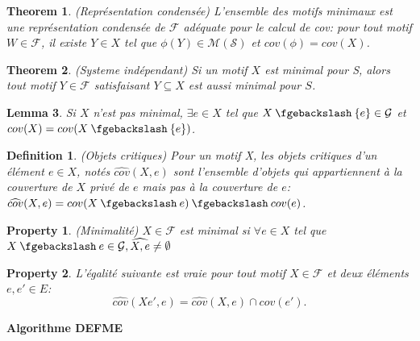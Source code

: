 \documentclass[a4paper,12pt,openany,oneside]{article}
\newcommand{\mysetminus}{\mathbin{\fgebackslash}}
\newtheorem{defn}{Definition} %
\newtheorem{theorem}{Theorem}[section]
\newtheorem{property}{Property}[theorem]
\newtheorem{lemma}[theorem]{Lemma}
\begin{document}
\begin{theorem}(Représentation condensée)
L'ensemble des motifs minimaux est une représentation condensée de $\mathcal{F}$ adéquate pour le calcul de cov: pour tout motif $W\in \mathcal{F}$, il existe $Y\in X$ tel que $\phi(Y)\in \mathcal{M}(\mathcal{S})$ et $cov(\phi)=cov(X)$.
\end{theorem}

\begin{theorem}(Systeme indépendant)
Si un motif $X$ est minimal pour S, alors tout motif $Y\in \mathcal{F}$ satisfaisant $Y\subseteq X$ est aussi minimal pour $S$.
\end{theorem}

\begin{lemma}
Si $X$ n'est pas minimal, $\exists e \in X$ tel que $X\mysetminus \{e\}\in \mathcal{G}$ et $cov(X)=cov(X\mysetminus\{e\})$.
\end{lemma}

\begin{defn}(Objets critiques)
Pour un motif X, les objets critiques d'un élément $e\in X$, notés $\widehat{cov}(X,e)$ sont l'ensemble d'objets qui appartiennent à la couverture de $X$ privé de $e$ mais pas à la couverture de $e$: $\widehat{cov}(X,e)=cov(X\mysetminus {e})\mysetminus cov(e)$.
\end{defn}

\begin{property} (Minimalité)
$X\in \mathcal{F}$ est minimal si $\forall e \in X$ tel que $X\mysetminus e\in \mathcal{G}, \widehat{X,e}\neq \emptyset $
\end{property}

\begin{property}
L'égalité suivante est vraie pour tout motif $X\in \mathcal{F}$ et deux éléments $e,e'\in E$:
\[
        \widehat{cov}(Xe',e)=\widehat{cov}(X,e)\cap cov(e').
\]
\end{property}


\textbf{Algorithme DEFME}
\end{document}
